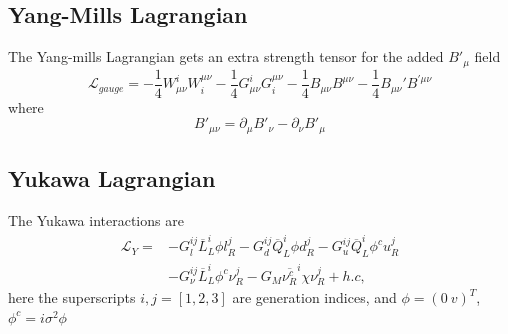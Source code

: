 \documentclass{report}
\numberwithin{equation}{section}
\begin{document}
\subsection{Yang-Mills Lagrangian}
The Yang-mills Lagrangian gets an extra strength tensor for the added $B'_\mu$ field
\begin{equation}
\mathcal{L}_{gauge}= 
-\frac{1}{4}W_{\mu\nu}^iW^{\mu\nu}_i-\frac{1}{4}G_{\mu\nu}^iG^{\mu\nu}_i-\frac{1}{4}B_{\mu\nu}B^{\mu\nu}-\frac{1}{4}B_{\mu\nu}'B^{'\mu\nu }
\end{equation}
where
\begin{equation}
B'_{\mu\nu}=\partial_\mu B'_\nu -\partial_\nu B'_\mu
\end{equation}
\subsection{Yukawa Lagrangian}
The Yukawa interactions are
\begin{equation}
\begin{split}
\mathcal{L}_Y=&-G_l^{ij}\overline{L}^{i}_L\phi l^{j}_R -G_d^{ij}\overline{Q}^{i}_L\phi d_R^{j}-G_u^{ij}\overline{Q}^{i}_L\phi^c u_R^{j}\\
&-G^{ij}_\nu\overline{L}^{i}_L \phi^c \nu_R^{j}-G_M\overline{\nu_R^c}^{i}\chi\nu_R^{j}+h.c,
\end{split}
\end{equation}
here the superscripts $i,j=[1,2,3]$ are generation indices, and $\phi=(0\ v)^T$, $\phi^c=i\sigma^2\phi$
\end{document}
